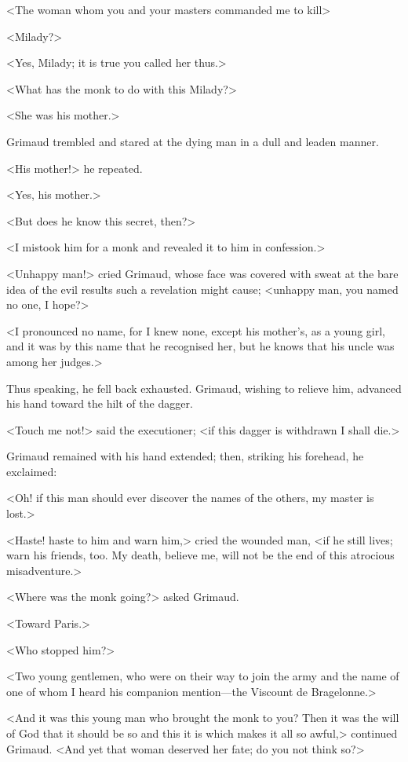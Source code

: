 <The woman whom you and your masters commanded me to kill\longdash>

<Milady?>

<Yes, Milady; it is true you called her thus.>

<What has the monk to do with this Milady?>

<She was his mother.>

Grimaud trembled and stared at the dying man in a dull and leaden manner.

<His mother!> he repeated.

<Yes, his mother.>

<But does he know this secret, then?>

<I mistook him for a monk and revealed it to him in confession.>

<Unhappy man!> cried Grimaud, whose face was covered with sweat at the bare idea of the evil results such a revelation might cause; <unhappy man, you named no one, I hope?>

<I pronounced no name, for I knew none, except his mother's, as a young girl, and it was by this name that he recognised her, but he knows that his uncle was among her judges.>

Thus speaking, he fell back exhausted. Grimaud, wishing to relieve him, advanced his hand toward the hilt of the dagger.

<Touch me not!> said the executioner; <if this dagger is withdrawn I shall die.>

Grimaud remained with his hand extended; then, striking his forehead, he exclaimed:

<Oh! if this man should ever discover the names of the others, my master is lost.>

<Haste! haste to him and warn him,> cried the wounded man, <if he still lives; warn his friends, too. My death, believe me, will not be the end of this atrocious misadventure.>

<Where was the monk going?> asked Grimaud.

<Toward Paris.>

<Who stopped him?>

<Two young gentlemen, who were on their way to join the army and the name of one of whom I heard his companion mention—the Viscount de Bragelonne.>

<And it was this young man who brought the monk to you? Then it was the will of God that it should be so and this it is which makes it all so awful,> continued Grimaud. <And yet that woman deserved her fate; do you not think so?>

